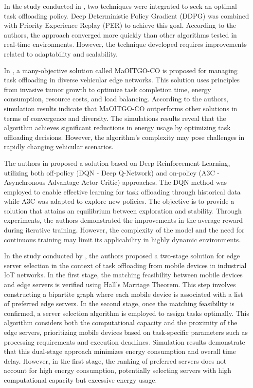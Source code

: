 \documentclass[iicol]{sn-jnl}
\begin{document}
In the study conducted in \cite{guo2024deep}, two techniques were integrated to seek an optimal task offloading policy. Deep Deterministic Policy Gradient (DDPG) was combined with Priority Experience Replay (PER) to achieve this goal. According to the authors, the approach converged more quickly than other algorithms tested in real-time environments. However, the technique developed requires improvements related to adaptability and scalability.

In \cite{wu2024efficient}, a many-objective solution called MaOITGO-CO is proposed for managing task offloading in diverse vehicular edge networks. This solution uses principles from invasive tumor growth to optimize task completion time, energy consumption, resource costs, and load balancing. According to the authors, simulation results indicate that MaOITGO-CO outperforms other solutions in terms of convergence and diversity. The simulations results reveal that the algorithm achieves significant reductions in energy usage by optimizing task offloading decisions. However, the algorithm's complexity may pose challenges in rapidly changing vehicular scenarios.

The authors in \cite{sharma2024intelligent} proposed a solution based on Deep Reinforcement Learning, utilizing both off-policy (DQN - Deep Q-Network) and on-policy (A3C - Asynchronous Advantage Actor-Critic) approaches. The DQN method was employed to enable effective learning for task offloading through historical data while A3C was adapted to explore new policies. The objective is to provide a solution that attains an equilibrium between exploration and stability. Through experiments, the authors demonstrated the improvements in the average reward during iterative training. However, the complexity of the model and the need for continuous training may limit its applicability in highly dynamic environments.

In the study conducted by \cite{sharma2024edge}, the authors proposed a two-stage solution for edge server selection in the context of task offloading from mobile devices in industrial IoT networks. In the first stage, the matching feasibility between mobile devices and edge servers is verified using Hall's Marriage Theorem. This step involves constructing a bipartite graph where each mobile device is associated with a list of preferred edge servers. In the second stage, once the matching feasibility is confirmed, a server selection algorithm is employed to assign tasks optimally. This algorithm considers both the computational capacity and the proximity of the edge servers, prioritizing mobile devices based on task-specific parameters such as processing requirements and execution deadlines. Simulation results demonstrate that this dual-stage approach minimizes energy consumption and overall time delay. However, in the first stage, the ranking of preferred servers does not account for high energy consumption, potentially selecting servers with high computational capacity but excessive energy usage.
\end{document}

